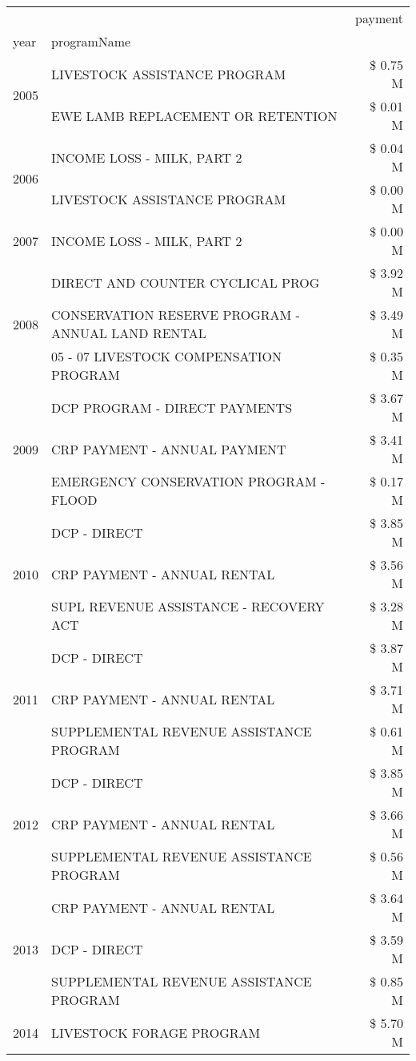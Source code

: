 \begin{tabular}{llr}
\toprule
 &  & payment \\
year & programName &  \\
\midrule
\multirow[t]{2}{*}{2005} & LIVESTOCK ASSISTANCE PROGRAM & \$ 0.75 M \\
 & EWE LAMB REPLACEMENT OR RETENTION & \$ 0.01 M \\
\cline{1-3}
\multirow[t]{2}{*}{2006} & INCOME LOSS - MILK, PART 2 & \$ 0.04 M \\
 & LIVESTOCK ASSISTANCE PROGRAM & \$ 0.00 M \\
\cline{1-3}
2007 & INCOME LOSS - MILK, PART 2 & \$ 0.00 M \\
\cline{1-3}
\multirow[t]{3}{*}{2008} & DIRECT AND COUNTER CYCLICAL PROG & \$ 3.92 M \\
 & CONSERVATION RESERVE PROGRAM - ANNUAL LAND RENTAL & \$ 3.49 M \\
 & 05 - 07 LIVESTOCK COMPENSATION PROGRAM & \$ 0.35 M \\
\cline{1-3}
\multirow[t]{3}{*}{2009} & DCP PROGRAM - DIRECT PAYMENTS & \$ 3.67 M \\
 & CRP PAYMENT - ANNUAL PAYMENT & \$ 3.41 M \\
 & EMERGENCY CONSERVATION PROGRAM - FLOOD & \$ 0.17 M \\
\cline{1-3}
\multirow[t]{3}{*}{2010} & DCP - DIRECT & \$ 3.85 M \\
 & CRP PAYMENT - ANNUAL RENTAL & \$ 3.56 M \\
 & SUPL REVENUE ASSISTANCE - RECOVERY ACT & \$ 3.28 M \\
\cline{1-3}
\multirow[t]{3}{*}{2011} & DCP - DIRECT & \$ 3.87 M \\
 & CRP PAYMENT - ANNUAL RENTAL & \$ 3.71 M \\
 & SUPPLEMENTAL REVENUE ASSISTANCE PROGRAM & \$ 0.61 M \\
\cline{1-3}
\multirow[t]{3}{*}{2012} & DCP - DIRECT & \$ 3.85 M \\
 & CRP PAYMENT - ANNUAL RENTAL & \$ 3.66 M \\
 & SUPPLEMENTAL REVENUE ASSISTANCE PROGRAM & \$ 0.56 M \\
\cline{1-3}
\multirow[t]{3}{*}{2013} & CRP PAYMENT - ANNUAL RENTAL & \$ 3.64 M \\
 & DCP - DIRECT & \$ 3.59 M \\
 & SUPPLEMENTAL REVENUE ASSISTANCE PROGRAM & \$ 0.85 M \\
\cline{1-3}
\multirow[t]{3}{*}{2014} & LIVESTOCK FORAGE PROGRAM & \$ 5.70 M \\

\end{tabular}
